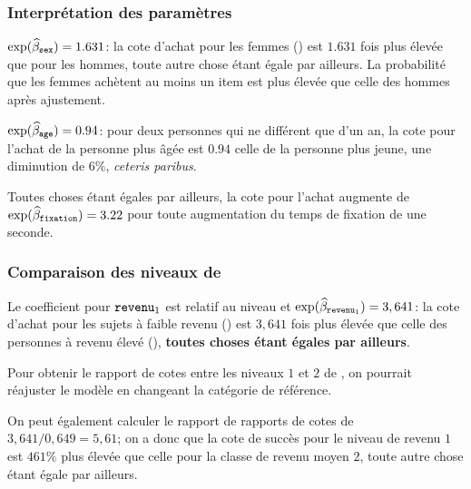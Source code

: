 \documentclass{beamer}
\begin{document}
\begin{frame}[fragile]
\frametitle{Interprétation des paramètres}
\bi
\item $\exp(\widehat{\beta}_{\texttt{sex}})=1.631$: la cote d'achat pour les femmes () est $1.631$ fois plus élevée que pour les hommes, toute autre chose étant égale par ailleurs. La probabilité que les femmes achètent au moins un item est plus élevée que celle des hommes après ajustement. 
\item $\exp(\widehat{\beta}_{\texttt{age}})=0.94$: pour deux personnes qui ne différent que d'un an, la cote pour l'achat de la personne plus âgée est $0.94$ celle de la personne plus jeune, une diminution de $6\%$, \textit{ceteris paribus}.

\item Toutes choses étant égales par ailleurs, la cote pour l'achat augmente de $\exp(\widehat{\beta}_{\texttt{fixation}})=3.22$ pour toute augmentation du temps de fixation de une seconde.

\ei
\end{frame}
\begin{frame}[fragile]
\frametitle{Comparaison des niveaux de }
\bi
\item Le coefficient pour $\texttt{revenu}_1$  est relatif au niveau  et $\exp(\widehat{\beta}_{\texttt{revenu}_1})=3,641$: la cote d'achat pour les sujets à faible revenu () est $3,641$ fois plus élevée que celle des personnes à revenu élevé (), \textbf{toutes choses étant égales par ailleurs}. 
\item Pour obtenir le rapport de cotes entre les niveaux $1$ et $2$ de , on pourrait réajuster le modèle en changeant la catégorie de référence.
\item On peut également calculer le rapport de rapports de cotes de $3,641/0,649=5,61$; on a donc que la cote de succès pour le niveau de revenu $1$ est $461\%$ plus élevée que celle pour la classe de revenu moyen $2$, toute autre chose étant égale par ailleurs.
\ei
\end{frame}
\end{document}
